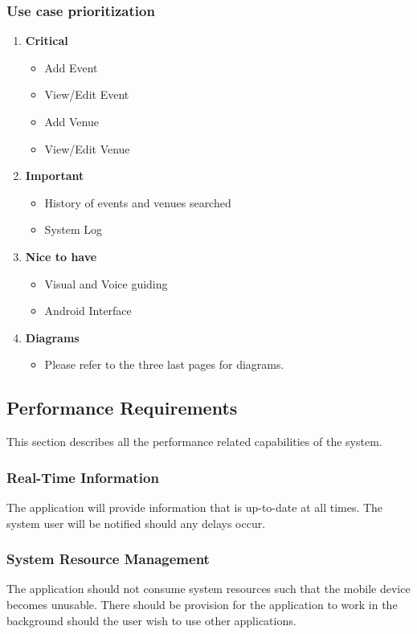 \documentclass[a4paper,10pt]{article}
\begin{document}
	\subsubsection{Use case prioritization} 
		\begin{enumerate} 
		\item \textbf{Critical} 
			\begin{itemize} 
				\item Add Event 
				\item View/Edit Event 
				\item Add Venue 
				\item View/Edit Venue 
			\end{itemize} 
		\item \textbf{Important} 
			\begin{itemize} 
				\item History of events and venues searched 
				\item System Log 
			\end{itemize} 
		\item \textbf{Nice to have} 
			\begin{itemize} 
				\item Visual and Voice guiding 
				\item Android Interface 
			\end{itemize} 
		\item \textbf{Diagrams}
			\begin{itemize} 
				\item Please refer to the three last pages for diagrams. 
			\end{itemize} 
		\end{enumerate} 

	\subsection{Performance Requirements}
   This section describes all the performance related capabilities of the system.
               \subsubsection{Real-Time Information}
  The application will provide information that is up-to-date at all times. The system user will be notified should any delays occur. 
               \subsubsection{System Resource Management}
   The application should not consume system resources such that the mobile device becomes unusable. There should be provision for the application to work in the background should the user wish to use other applications.
   
\end{document}
